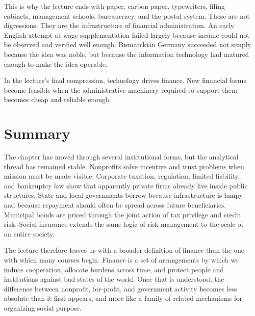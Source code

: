This is why the lecture ends with paper, carbon paper, typewriters, filing cabinets, management schools, bureaucracy, and the postal system. These are not digressions. They are the infrastructure of financial administration. An early English attempt at wage supplementation failed largely because income could not be observed and verified well enough. Bismarckian Germany succeeded not simply because the idea was noble, but because the information technology had matured enough to make the idea operable.

In the lecture's final compression, technology drives finance. New financial forms become feasible when the administrative machinery required to support them becomes cheap and reliable enough.

\section{Summary}

The chapter has moved through several institutional forms, but the analytical thread has remained stable. Nonprofits solve incentive and trust problems when mission must be made visible. Corporate taxation, regulation, limited liability, and bankruptcy law show that apparently private firms already live inside public structures. State and local governments borrow because infrastructure is lumpy and because repayment should often be spread across future beneficiaries. Municipal bonds are priced through the joint action of tax privilege and credit risk. Social insurance extends the same logic of risk management to the scale of an entire society.

The lecture therefore leaves us with a broader definition of finance than the one with which many courses begin. Finance is a set of arrangements by which we induce cooperation, allocate burdens across time, and protect people and institutions against bad states of the world. Once that is understood, the difference between nonprofit, for-profit, and government activity becomes less absolute than it first appears, and more like a family of related mechanisms for organizing social purpose.